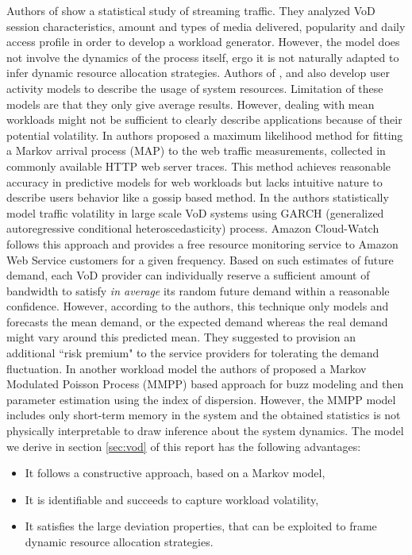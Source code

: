 \documentclass[twoside]{article}
\newcommand{\roy}[2]{#2}
\begin{document}
Authors of \cite{GarSim2007} show a statistical study of streaming traffic. They analyzed VoD session characteristics, amount and types of media delivered, popularity and daily access profile in order to develop a workload generator. However, the model does not involve the dynamics of the process itself, ergo it is not naturally adapted to infer dynamic resource allocation strategies. Authors of \cite{LiPerf1996}, \cite{MelMul2009} and \cite{Kanrar2012} also develop \roy{a}{}user activity model\roy{}{s} to describe the usage of system resources. \roy{}{Limitation of these models are that they only give} average results. \roy{}{However, dealing with mean workloads might not be sufficient to clearly describe applications because of their potential volatility}. In \cite{CasaleIEEECloud11} authors proposed a maximum likelihood method for fitting a Markov arrival process (MAP) to the web traffic measurements, collected in commonly available HTTP web server traces. This method achieves reasonable accuracy in predictive models for web workloads but lacks intuitive nature to describe users behavior like a gossip based method. In \cite{NiuNOSS11} the authors statistically model traffic volatility in large scale VoD systems using GARCH (generalized autoregressive conditional heteroscedasticity) process. Amazon Cloud-Watch follows this approach and provides a free resource monitoring service to Amazon Web Service customers for a given frequency. Based on such estimates of future demand, each VoD provider can individually reserve a sufficient amount of bandwidth to satisfy {\it in average} its random future demand within a reasonable confidence. However, according to the authors, this technique only models and forecasts the mean demand, or the expected demand whereas the real demand might vary around this predicted mean.\roy{}{ They suggested to provision an additional ``risk premium" to the service providers for tolerating the demand fluctuation}. In another workload model the authors of \cite{Perez-Palacin12} \cite{Gusella91} proposed a Markov Modulated Poisson Process (MMPP) based approach for buzz modeling and then parameter estimation using the index of dispersion. However, the MMPP model includes only short-term memory in the system and the obtained statistics is not \roy{}{physically interpretable to draw inference about the system dynamics}. \newline
The model we derive in section \ref{sec:vod} of this report has the following advantages:
\begin{itemize}
\item It follows a constructive approach, based on a Markov model, 
\item It is identifiable and succeeds to capture workload vo\-la\-ti\-li\-ty, 
\item It satisfies the large deviation properties, that can be exploited to frame dynamic resource allocation strategies.
\end{itemize}
\roy{We believe this model along with its identification procedure can be of some interest to the VoD operators.}{}
\newpage
\end{document}

